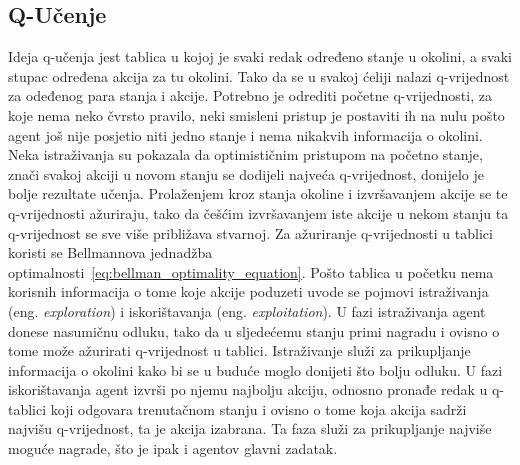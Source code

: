 \subsection{Q-Učenje}
Ideja q-učenja jest tablica u kojoj je svaki redak određeno stanje u okolini, a svaki stupac određena akcija za tu okolini. Tako da se u svakoj ćeliji nalazi q-vrijednost za odeđenog para stanja i akcije. Potrebno je odrediti početne q-vrijednosti, za koje nema neko čvrsto pravilo, neki smisleni pristup je postaviti ih na nulu pošto agent još nije posjetio niti jedno stanje i nema nikakvih informacija o okolini. Neka istraživanja su pokazala da optimističnim pristupom na početno stanje, znači svakoj akciji u novom stanju se dodijeli najveća q-vrijednost, donijelo je bolje rezultate učenja. Prolaženjem kroz stanja okoline i izvršavanjem akcije se te q-vrijednosti ažuriraju, tako da češćim izvršavanjem iste akcije u nekom stanju ta q-vrijednost se sve više približava stvarnoj. Za ažuriranje q-vrijednosti u tablici koristi se Bellmannova jednadžba optimalnosti~\ref{eq:bellman_optimality_equation}. Pošto tablica u početku nema korisnih informacija o tome koje akcije poduzeti uvode se pojmovi istraživanja (eng. \textit{exploration}) i iskorištavanja (eng. \textit{exploitation}). U fazi istraživanja agent donese nasumičnu odluku, tako da u sljedećemu stanju primi nagradu i ovisno o tome može ažurirati q-vrijednost u tablici. Istraživanje služi za prikupljanje informacija o okolini kako bi se u buduće moglo donijeti što bolju odluku. U fazi iskorištavanja agent izvrši po njemu najbolju akciju, odnosno pronađe redak u q-tablici koji odgovara trenutačnom stanju i ovisno o tome koja akcija sadrži najvišu q-vrijednost, ta je akcija izabrana. Ta faza služi za prikupljanje najviše moguće nagrade, što je ipak i agentov glavni zadatak. 


